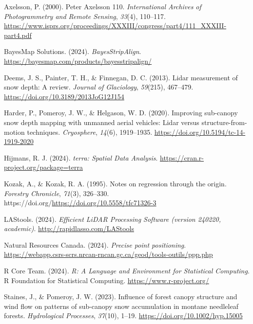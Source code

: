 \documentclass[
  letterpaper,
  DIV=11,
  numbers=noendperiod]{scrartcl}
\newlength{\cslhangindent}
\newenvironment{CSLReferences}[2] %
 {\begin{list}{}{%
  \setlength{\itemindent}{0pt}
  \setlength{\leftmargin}{0pt}
  \setlength{\parsep}{0pt}
  \ifodd #1
   \setlength{\leftmargin}{\cslhangindent}
   \setlength{\itemindent}{-1\cslhangindent}
  \fi
  \setlength{\itemsep}{#2\baselineskip}}}
 {\end{list}}
\begin{document}
\label{refs}
\begin{CSLReferences}{1}{0}
Axelsson, P. (2000). {Peter Axelsson 110}. \emph{International Archives
of Photogrammetry and Remote Sensing}, \emph{33}(4), 110--117.
\url{https://www.isprs.org/proceedings/XXXIII/congress/part4/111_XXXIII-part4.pdf}

BayesMap Solutions. (2024). \emph{{BayesStripAlign}}.
\url{https://bayesmap.com/products/bayesstripalign/}

Deems, J. S., Painter, T. H., \& Finnegan, D. C. (2013). {Lidar
measurement of snow depth: A review}. \emph{Journal of Glaciology},
\emph{59}(215), 467--479. \url{https://doi.org/10.3189/2013JoG12J154}

Harder, P., Pomeroy, J. W., \& Helgason, W. D. (2020). {Improving
sub-canopy snow depth mapping with unmanned aerial vehicles: Lidar
versus structure-from-motion techniques}. \emph{Cryosphere},
\emph{14}(6), 1919--1935. \url{https://doi.org/10.5194/tc-14-1919-2020}

Hijmans, R. J. (2024). \emph{{terra: Spatial Data Analysis}}.
\url{https://cran.r-project.org/package=terra}

Kozak, A., \& Kozak, R. A. (1995). {Notes on regression through the
origin}. \emph{Forestry Chronicle}, \emph{71}(3), 326--330.
https://doi.org/\url{https://doi.org/10.5558/tfc71326-3}

LAStools. (2024). \emph{{Efficient LiDAR Processing Software (version
240220, academic)}}. \url{http://rapidlasso.com/LAStools}

Natural Resources Canada. (2024). \emph{{Precise point positioning}}.
\url{https://webapp.csrs-scrs.nrcan-rncan.gc.ca/geod/tools-outils/ppp.php}

R Core Team. (2024). \emph{{R: A Language and Environment for
Statistical Computing}}. R Foundation for Statistical Computing.
\url{https://www.r-project.org/}

Staines, J., \& Pomeroy, J. W. (2023). {Influence of forest canopy
structure and wind flow on patterns of sub-canopy snow accumulation in
montane needleleaf forests}. \emph{Hydrological Processes},
\emph{37}(10), 1--19. \url{https://doi.org/10.1002/hyp.15005}

\end{CSLReferences}
\end{document}
